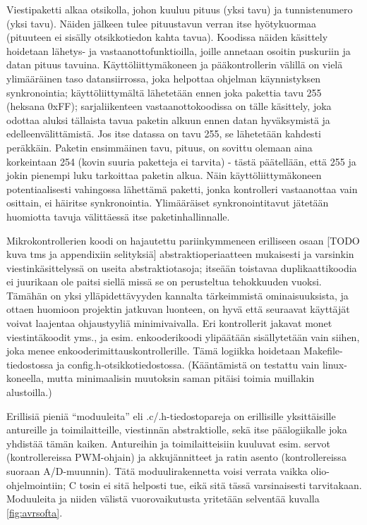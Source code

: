 \documentclass{article}
\begin{document}
Viestipaketti alkaa otsikolla, johon kuuluu pituus (yksi tavu) ja tunnistenumero (yksi tavu). Näiden jälkeen tulee pituustavun verran itse hyötykuormaa (pituuteen ei sisälly otsikkotiedon kahta tavua). Koodissa näiden käsittely hoidetaan lähetys- ja vastaanottofunktioilla, joille annetaan osoitin puskuriin ja datan pituus tavuina. Käyttöliittymäkoneen ja pääkontrollerin välillä on vielä ylimääräinen taso datansiirrossa, joka helpottaa ohjelman käynnistyksen synkronointia; käyttöliittymältä lähetetään ennen joka pakettia tavu 255 (heksana 0xFF); sarjaliikenteen vastaanottokoodissa on tälle käsittely, joka odottaa aluksi tällaista tavua paketin alkuun ennen datan hyväksymistä ja edelleenvälittämistä. Jos itse datassa on tavu 255, se lähetetään kahdesti peräkkäin. Paketin ensimmäinen tavu, pituus, on sovittu olemaan aina korkeintaan 254 (kovin suuria paketteja ei tarvita) - tästä päätellään, että 255 ja jokin pienempi luku tarkoittaa paketin alkua. Näin käyttöliittymäkoneen potentiaalisesti vahingossa lähettämä paketti, jonka kontrolleri vastaanottaa vain osittain, ei häiritse synkronointia. Ylimääräiset synkronointitavut jätetään huomiotta tavuja välittäessä itse paketinhallinnalle.

Mikrokontrollerien koodi on hajautettu pariinkymmeneen erilliseen osaan [TODO kuva tms ja appendixiin selityksiä] abstraktioperiaatteen mukaisesti ja varsinkin viestinkäsittelyssä on useita abstraktiotasoja; itseään toistavaa duplikaattikoodia ei juurikaan ole paitsi siellä missä se on perusteltua tehokkuuden vuoksi. Tämähän on yksi ylläpidettävyyden kannalta tärkeimmistä ominaisuuksista, ja ottaen huomioon projektin jatkuvan luonteen, on hyvä että seuraavat käyttäjät voivat laajentaa ohjaustyyliä minimivaivalla. Eri kontrollerit jakavat monet viestintäkoodit yms., ja esim. enkooderikoodi ylipäätään sisällytetään vain siihen, joka menee enkooderimittauskontrollerille. Tämä logiikka hoidetaan Makefile-tiedostossa \cite{bib:make} ja config.h-otsikkotiedostossa. (Kääntämistä on testattu vain linux-koneella, mutta minimaalisin muutoksin saman pitäisi toimia muillakin alustoilla.)

Erillisiä pieniä ``moduuleita'' eli .c/.h-tiedostopareja on erillisille yksittäisille antureille ja toimilaitteille, viestinnän abstraktiolle, sekä itse päälogiikalle joka yhdistää tämän kaiken. Antureihin ja toimilaitteisiin kuuluvat esim. servot (kontrollereissa PWM-ohjain) ja akkujännitteet ja ratin asento (kontrollereissa suoraan A/D-muunnin). Tätä moduulirakennetta voisi verrata vaikka olio-ohjelmointiin; C tosin ei sitä helposti tue, eikä sitä tässä varsinaisesti tarvitakaan. Moduuleita ja niiden välistä vuorovaikutusta yritetään selventää kuvalla \ref{fig:avrsofta}.
\end{document}
